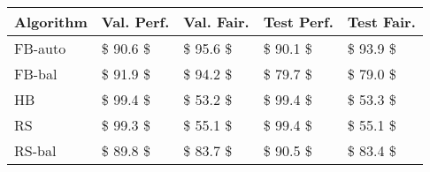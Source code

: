 \begin{tabular}{lllll}
\toprule
Algorithm & Val. Perf. & Val. Fair. & Test Perf. & Test Fair. \\
\midrule
  FB-auto &   \$ 90.6 \$ &   \$ 95.6 \$ &   \$ 90.1 \$ &   \$ 93.9 \$ \\
   FB-bal &   \$ 91.9 \$ &   \$ 94.2 \$ &   \$ 79.7 \$ &   \$ 79.0 \$ \\
       HB &   \$ 99.4 \$ &   \$ 53.2 \$ &   \$ 99.4 \$ &   \$ 53.3 \$ \\
       RS &   \$ 99.3 \$ &   \$ 55.1 \$ &   \$ 99.4 \$ &   \$ 55.1 \$ \\
   RS-bal &   \$ 89.8 \$ &   \$ 83.7 \$ &   \$ 90.5 \$ &   \$ 83.4 \$ \\
\bottomrule
\end{tabular}
